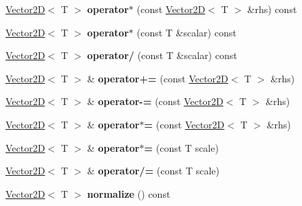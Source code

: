 \begin{DoxyCompactItemize}
\item 
\mbox{\label{class_vector2_d_af818b11548beb3d812061cc23c8f7738}} 
\hyperlink{class_vector2_d}{Vector2D}$<$ T $>$ {\bfseries operator$\ast$} (const \hyperlink{class_vector2_d}{Vector2D}$<$ T $>$ \&rhs) const
\item 
\mbox{\label{class_vector2_d_a25e6a98a37733d5307cd29c72102a2b3}} 
\hyperlink{class_vector2_d}{Vector2D}$<$ T $>$ {\bfseries operator$\ast$} (const T \&scalar) const
\item 
\mbox{\label{class_vector2_d_a29c36f3be2df4ef95114487dc765bd11}} 
\hyperlink{class_vector2_d}{Vector2D}$<$ T $>$ {\bfseries operator/} (const T \&scalar) const
\item 
\mbox{\label{class_vector2_d_a2a04e7b0b8c9c0dcf466653104495fc4}} 
\hyperlink{class_vector2_d}{Vector2D}$<$ T $>$ \& {\bfseries operator+=} (const \hyperlink{class_vector2_d}{Vector2D}$<$ T $>$ \&rhs)
\item 
\mbox{\label{class_vector2_d_aea6860422a4f30cf7c6cf72d6fcdaf62}} 
\hyperlink{class_vector2_d}{Vector2D}$<$ T $>$ \& {\bfseries operator-\/=} (const \hyperlink{class_vector2_d}{Vector2D}$<$ T $>$ \&rhs)
\item 
\mbox{\label{class_vector2_d_acb2dcee0abd8d5dbad45c1ee5cf9ad85}} 
\hyperlink{class_vector2_d}{Vector2D}$<$ T $>$ \& {\bfseries operator$\ast$=} (const \hyperlink{class_vector2_d}{Vector2D}$<$ T $>$ \&rhs)
\item 
\mbox{\label{class_vector2_d_a8ddc2d65ec361dc829711022c41eb407}} 
\hyperlink{class_vector2_d}{Vector2D}$<$ T $>$ \& {\bfseries operator$\ast$=} (const T scale)
\item 
\mbox{\label{class_vector2_d_a8cb83514b70eb0dc90a699c375a7af37}} 
\hyperlink{class_vector2_d}{Vector2D}$<$ T $>$ \& {\bfseries operator/=} (const T scale)
\item 
\mbox{\label{class_vector2_d_ab85a8ff67d6067d4e365ea55c748283d}} 
\hyperlink{class_vector2_d}{Vector2D}$<$ T $>$ {\bfseries normalize} () const
\end{DoxyCompactItemize}
